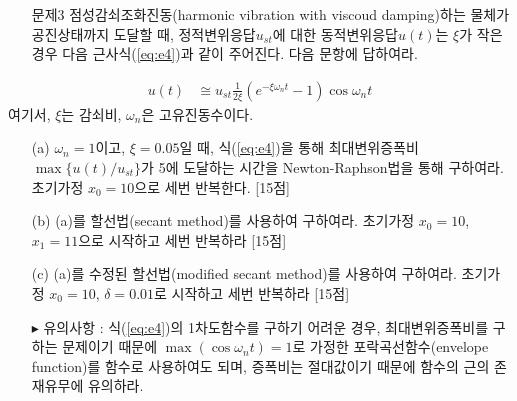 \documentclass[a4,10pt]{article}
\numberwithin{algorithm}{section}
\theoremstyle{examplestyle}
\let\\\tabularnewline
\let\\\tabularnewline
\begin{document}
\begin{itemize}
\item[문제3] 점성감쇠조화진동(harmonic vibration with viscoud damping)하는 물체가 공진상태까지 도달할 때, 정적변위응답$u_{st}$에 대한 동적변위응답$u(t)$는 $\xi$가 작은 경우 다음 근사식(\ref{eq:e4})과 같이 주어진다. 다음 문항에 답하여라.
\end{itemize}
\begin{align}
u(t)&\cong u_{st}\frac{1}{2\xi}\left(e^{-\xi\omega_{n}t}-1\right)\cos\omega_{n}t\label{eq:e4}
\end{align}
여기서, $\xi$는 감쇠비, $\omega_{n}$은 고유진동수이다.
\begin{itemize}
\item[(a)] $\omega_{n}=1$이고, $\xi=0.05$일 때, 식(\ref{eq:e4})을 통해 최대변위증폭비 $\max\{u(t)/u_{st}\}$가 5에 도달하는 시간을 Newton-Raphson법을 통해 구하여라. 초기가정 $x_{0}=10$으로 세번 반복한다. [15점]
\item[(b)] (a)를 할선법(secant method)를 사용하여 구하여라. 초기가정 $x_{0}=10$, $x_{1}=11$으로 시작하고 세번 반복하라 [15점]
\item[(c)] (a)를 수정된 할선법(modified secant method)를 사용하여 구하여라. 초기가정 $x_{0}=10$, $\delta=0.01$로 시작하고 세번 반복하라 [15점]
\item[$\blacktriangleright$]유의사항 : 식(\ref{eq:e4})의 1차도함수를 구하기 어려운 경우, 최대변위증폭비를 구하는 문제이기 때문에 $\max(\cos\omega_{n}t)=1$로 가정한 포락곡선함수(envelope function)를 함수로 사용하여도 되며, 증폭비는 절대값이기 때문에 함수의 근의 존재유무에 유의하라.
\end{itemize}
\end{document}
